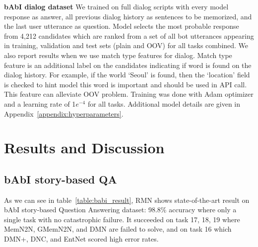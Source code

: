 \documentclass{article} \usepackage{iclr2018_conference,times}
\begin{document}
\textbf{bAbI dialog dataset} \quad 
We trained on full dialog scripts with every model response as answer, all previous dialog history as sentences to be memorized, and the last user utterance as question. 
Model selects the most probable response from 4,212 candidates which are ranked from a set of all bot utterances appearing in training, validation and test sets (plain and OOV) for all tasks combined. 
We also report results when we use match type features for dialog. 
Match type feature is an additional label on the candidates indicating if word is found on the dialog history.
For example, if the world `Seoul' is found, then the `location' field is checked to hint model this word is important and should be used in API call.
This feature can alleviate OOV problem. 
Training was done with Adam optimizer and a learning rate of 1$e^{-4}$ for all tasks.
Additional model details are given in Appendix~\ref{appendix:hyperparameters}.




\section{Results and Discussion}

\subsection{bAbI story-based QA}

As we can see in table~\ref{table:babi_result}, RMN shows state-of-the-art result on bAbI story-based Question Answering dataset: 98.8\% accuracy where only a single task with no catastrophic failure. 
It succeeded on task 17, 18, 19 where MemN2N, GMemN2N, and DMN are failed to solve, and on task 16 which DMN+, DNC, and EntNet scored high error rates.
\end{document}
